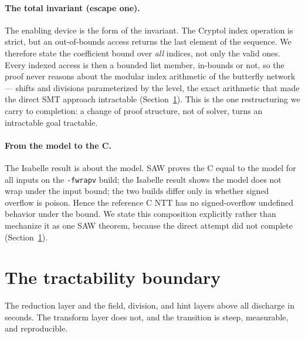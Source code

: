 \documentclass[11pt]{article}
\newcommand{\code}[1]{\texttt{#1}}
\begin{document}
\paragraph{The total invariant (escape one).} The enabling device is the form of the invariant. The
Cryptol index operation is strict, but an out-of-bounds access returns the last element of the sequence.
We therefore state the coefficient bound over \emph{all} indices, not only the valid ones. Every indexed
access is then a bounded list member, in-bounds or not, so the proof never reasons about the modular
index arithmetic of the butterfly network --- shifts and divisions parameterized by the level, the exact
arithmetic that made the direct SMT approach intractable (Section~\ref{sec:boundary}). This is the one
restructuring we carry to completion: a change of proof structure, not of solver, turns an intractable
goal tractable.

\paragraph{From the model to the C.} The Isabelle result is about the model. SAW proves the C equal to
the model for all inputs on the \code{-fwrapv} build; the Isabelle result shows the model does not wrap
under the input bound; the two builds differ only in whether signed overflow is poison. Hence the
reference C NTT has no signed-overflow undefined behavior under the bound. We state this composition
explicitly rather than mechanize it as one SAW theorem, because the direct attempt did not complete
(Section~\ref{sec:boundary}).

\section{The tractability boundary}\label{sec:boundary}

The reduction layer and the field, division, and hint layers above all discharge in seconds. The
transform layer does not, and the transition is steep, measurable, and reproducible.
\end{document}
